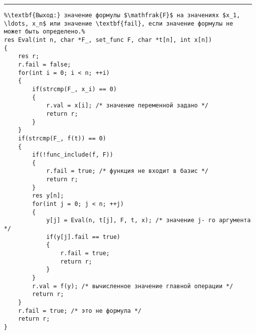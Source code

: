 \vspace{5pt} \hrule
\begin{lstlisting}[caption={Интерпретация формул - рекурсивная функция Eval}, label=p_112, escapechar=\%]
%\noindent\textbf{Вход:} формула $\mathfrak{F}$, множество F функций базиса, значения переменных $x_1, \ldots, x_n$.\\%
%\textbf{Выход:} значение формулы $\mathfrak{F}$ на значениях $x_1, \ldots, x_n$ или значение \textbf{fail}, если значение формулы не может быть определено.%
res Eval(int n, char *F_, set_func F, char *t[n], int x[n])
{
	res r;
	r.fail = false;
	for(int i = 0; i < n; ++i)
	{
		if(strcmp(F_, x_i) == 0)
		{
			r.val = x[i]; /* значение переменной задано */
			return r;
		}
	}
	if(strcmp(F_, f(t)) == 0)
	{
		if(!func_include(f, F))
		{
			r.fail = true; /* функция не входит в базис */
			return r;
		}
		res y[n];
		for(int j = 0; j < n; ++j)
		{
			y[j] = Eval(n, t[j], F, t, x); /* значение j- го аргумента */
			if(y[j].fail == true)
			{
				r.fail = true;
				return r;
			}
		}
		r.val = f(y); /* вычисленное значение главной операции */
		return r;
	}
	r.fail = true; /* это не формула */
	return r;
}
\end{lstlisting}
